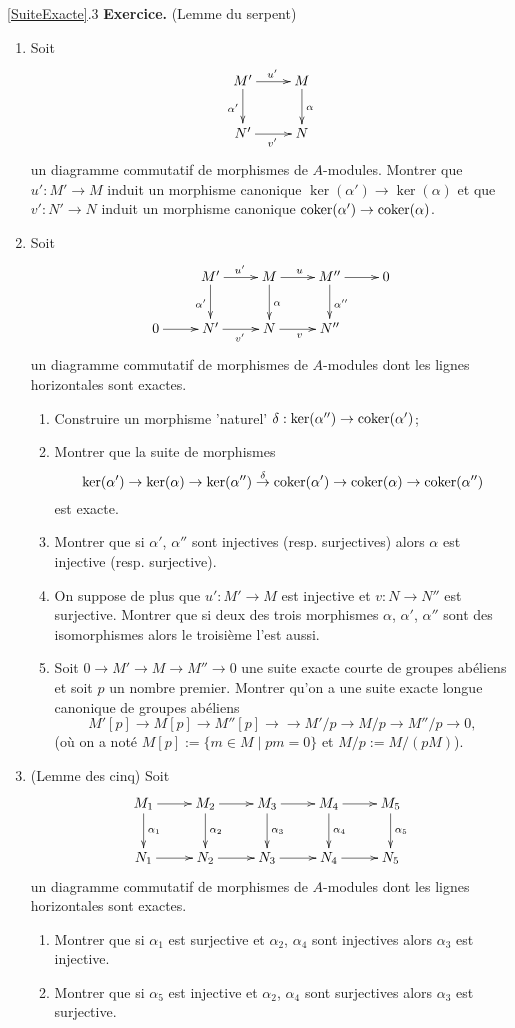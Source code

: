\documentclass[a4paper, oneside, 12pt]{book}
\theoremstyle{theoremeStyle} %
\theoremstyle{definition} %
\begin{document}
\ref{SuiteExacte}.3 \textbf{Exercice.} (Lemme du serpent) 
\begin{enumerate}
\item Soit $$\xymatrix{M'\ar[r]^{u'}\ar[d]_{\alpha'}&M\ar[d]^{\alpha}\\
N'\ar[r]_{v'}&N}$$
un diagramme commutatif de morphismes de $A$-modules. Montrer que $u':M'\rightarrow M$ induit un morphisme canonique $\ker(\alpha')\rightarrow \ker(\alpha)$ et que $v':N'\rightarrow N$ induit un morphisme canonique $\hbox{\rm coker}(\alpha')\rightarrow\hbox{\rm coker}(\alpha)$.
\item Soit
$$\xymatrix{&M'\ar[r]^{u'}\ar[d]_{\alpha'}&M\ar[d]^{\alpha}\ar[r]^{u}&M''\ar[r]\ar[d]^{\alpha''}&0\\
0\ar[r]&N'\ar[r]_{v'}&N\ar[r]_{v}&N''}$$
un diagramme commutatif de morphismes de $A$-modules dont les lignes horizontales sont exactes.
\begin{enumerate}
\item Construire un morphisme 'naturel' $\delta:\ker(\alpha'')\rightarrow\hbox{\rm coker}(\alpha')$;
\item Montrer que la suite de morphismes
$$\ker(\alpha')\rightarrow\ker(\alpha)\rightarrow\ker(\alpha'')\stackrel{\delta}{\rightarrow} \hbox{\rm coker}(\alpha')\rightarrow\hbox{\rm coker}(\alpha)\rightarrow\hbox{\rm coker}(\alpha'') $$
est exacte.
\item Montrer que si $\alpha'$, $\alpha''$ sont injectives (resp. surjectives) alors $\alpha$ est injective (resp. surjective).
\item On suppose de plus que $u':M'\rightarrow M$ est injective et $v:N\rightarrow N''$ est surjective. Montrer que si deux des trois morphismes $\alpha$, $\alpha'$, $\alpha''$ sont des isomorphismes alors le troisième l'est aussi.
\item Soit $0\rightarrow M'\rightarrow M\rightarrow M''\rightarrow 0$ une suite exacte courte de groupes abéliens et soit $p$ un nombre premier. Montrer qu'on a une suite exacte longue canonique de groupes abéliens
$$M'[p]\rightarrow M[p]\rightarrow M''[p]\rightarrow\rightarrow M'/p\rightarrow M/p\rightarrow M''/p\rightarrow 0,$$
(où on a noté $M[p]:=\lbrace m\in M\; |\; pm=0\rbrace$ et $M/p:=M/(pM)$).
\end{enumerate}
\item (Lemme des cinq) Soit
$$\xymatrix{M_{1}\ar[r]\ar[d]^{\alpha_{1}}&M_{2}\ar[r]\ar[d]^{\alpha_{2}}&M_{3}\ar[r]\ar[d]^{\alpha_{3}}&M_{4}\ar[r]\ar[d]^{\alpha_{4}}&M_{5}\ar[d]^{\alpha_{5}}\\
N_{1}\ar[r]&N_{2}\ar[r]&N_{3}\ar[r]&N_{4}\ar[r] &N_{5}}$$
un diagramme commutatif de morphismes de $A$-modules dont les lignes horizontales sont exactes.
\begin{enumerate}
\item Montrer que si $\alpha_{1}$ est surjective et $\alpha_{2}$, $\alpha_{4}$ sont injectives alors $\alpha_{3}$ est injective.
\item  Montrer que si $\alpha_{5}$ est injective et $\alpha_{2}$, $\alpha_{4}$ sont surjectives alors $\alpha_{3}$ est surjective.
\end{enumerate}
\end{enumerate}
\end{document}
